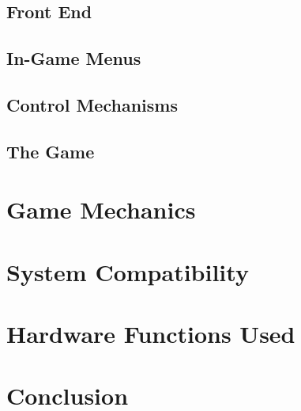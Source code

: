 \documentclass{article}
\begin{document}
\subsection{Front End}
\subsection{In-Game Menus}
\subsection{Control Mechanisms}
\subsection{The Game}
\section{Game Mechanics}
\section{System Compatibility}
\section{Hardware Functions Used}
\section{Conclusion}
 
\end{document}
